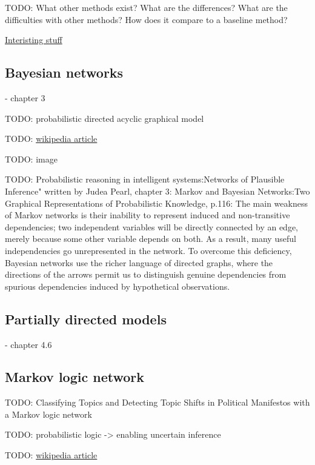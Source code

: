 TODO: What other methods exist? What are the differences? What are the difficulties with other methods? How does it compare to a baseline method?

\href{https://www.math.leidenuniv.nl/scripties/BSC-Obbens.pdf}{Interisting stuff} \cite{obbens2014inference}


\subsection{Bayesian networks}

- chapter 3

TODO: probabilistic directed acyclic graphical model

TODO: \href{https://en.wikipedia.org/wiki/Bayesian_network}{wikipedia article}

TODO: image

TODO: Probabilistic reasoning in intelligent systems:Networks of Plausible Inference" written by Judea Pearl, chapter 3: Markov and Bayesian Networks:Two Graphical Representations of Probabilistic Knowledge, p.116:
The main weakness of Markov networks is their inability to represent induced and non-transitive dependencies; two independent variables will be directly connected by an edge, merely because some other variable depends on both. As a result, many useful independencies go unrepresented in the network. To overcome this deficiency, Bayesian networks use the richer language of directed graphs, where the directions of the arrows permit us to distinguish genuine dependencies from spurious dependencies induced by hypothetical observations.

\subsection{Partially directed models}

- chapter 4.6


\subsection{Markov logic network}

TODO: Classifying Topics and Detecting Topic Shifts in Political Manifestos with a Markov logic network \cite{zirn2016classifying}

TODO: probabilistic logic -> enabling uncertain inference

TODO: \href{https://en.wikipedia.org/wiki/Markov_logic_network}{wikipedia article}

